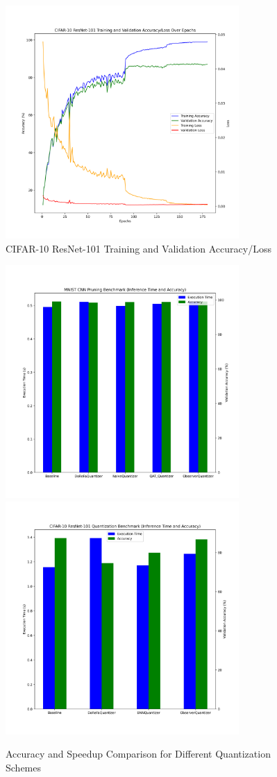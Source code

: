 \documentclass{article}
\begin{document}
\begin{figure}
	\centerline{\includegraphics[width=3.5in]{../proj2/figures/cifar10_baseline.png}}
	\caption{CIFAR-10 ResNet-101 Training and Validation Accuracy/Loss}
	\label{fig:cifar-resnet-nq}
\end{figure}

\begin{figure}
	\centerline{\includegraphics[width=3.5in]{../proj2/figures/mnist_cnn_benchmark.png}\includegraphics[width=3.5in]{../proj2/figures/cifar10_resnet101_benchmark.png}}
	\caption{Accuracy and Speedup Comparison for Different Quantization Schemes}
	\label{fig:quantization-compare}
\end{figure}
\end{document}
